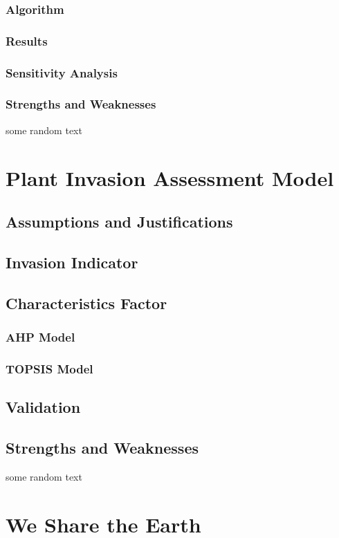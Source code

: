 \documentclass[12pt]{article}
\begin{document}
		\subsubsection{Algorithm}
		
		\subsubsection{Results}
		
		\subsubsection{Sensitivity Analysis}
		
		\subsubsection{Strengths and Weaknesses}
	
		some random text
		
\section{Plant Invasion Assessment Model}

	\subsection{Assumptions and Justifications}
	
	\subsection{Invasion Indicator}
	
	\subsection{Characteristics Factor}
	
		\subsubsection{AHP Model}
			
		\subsubsection{TOPSIS Model}
	
	\subsection{Validation}
	
	\subsection{Strengths and Weaknesses}

	some random text
	
\section*{We Share the Earth}



\newrefcontext[sorting=nyt]
\printbibliography
\end{document}
